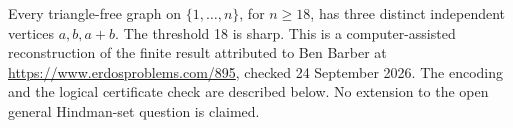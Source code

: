 Every triangle-free graph on \(\{1,\ldots,n\}\), for \(n\geq18\),
has three distinct independent vertices \(a,b,a+b\).
The threshold 18 is sharp. This is a computer-assisted
reconstruction of the finite result attributed to Ben Barber
at \url{https://www.erdosproblems.com/895}, checked
24 September 2026. The encoding and the logical certificate
check are described below. No extension to the open general
Hindman-set question is claimed.
